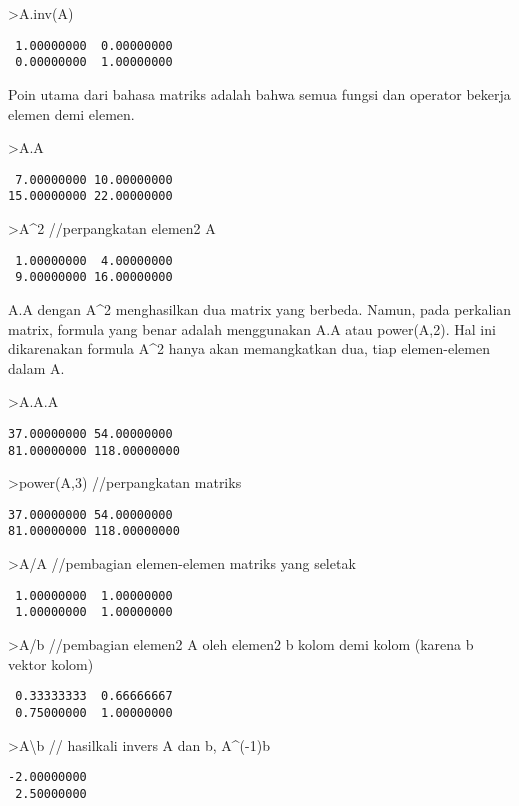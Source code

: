 \documentclass[
]{book}
\begin{document}
\textgreater A.inv(A)

\begin{verbatim}
 1.00000000  0.00000000 
 0.00000000  1.00000000 
\end{verbatim}

Poin utama dari bahasa matriks adalah bahwa semua fungsi dan operator bekerja elemen demi elemen.

\textgreater A.A

\begin{verbatim}
 7.00000000 10.00000000 
15.00000000 22.00000000 
\end{verbatim}

\textgreater A\^{}2 //perpangkatan elemen2 A

\begin{verbatim}
 1.00000000  4.00000000 
 9.00000000 16.00000000 
\end{verbatim}

A.A dengan A\^{}2 menghasilkan dua matrix yang berbeda. Namun, pada perkalian matrix, formula yang benar adalah menggunakan A.A atau power(A,2). Hal ini dikarenakan formula A\^{}2 hanya akan memangkatkan dua, tiap elemen-elemen dalam A.

\textgreater A.A.A

\begin{verbatim}
37.00000000 54.00000000 
81.00000000 118.00000000 
\end{verbatim}

\textgreater power(A,3) //perpangkatan matriks

\begin{verbatim}
37.00000000 54.00000000 
81.00000000 118.00000000 
\end{verbatim}

\textgreater A/A //pembagian elemen-elemen matriks yang seletak

\begin{verbatim}
 1.00000000  1.00000000 
 1.00000000  1.00000000 
\end{verbatim}

\textgreater A/b //pembagian elemen2 A oleh elemen2 b kolom demi kolom (karena b vektor kolom)

\begin{verbatim}
 0.33333333  0.66666667 
 0.75000000  1.00000000 
\end{verbatim}

\textgreater A\textbackslash b // hasilkali invers A dan b, A\^{}(-1)b

\begin{verbatim}
-2.00000000 
 2.50000000 
\end{verbatim}
\end{document}
